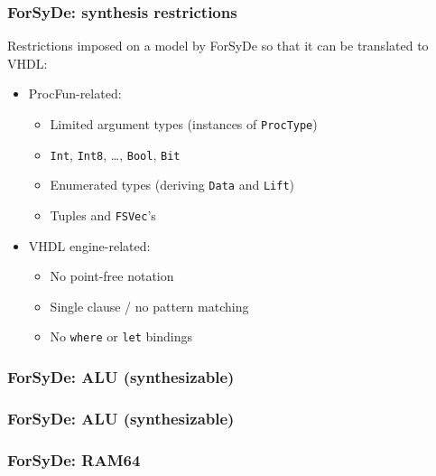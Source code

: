         \begin{frame}
            \frametitle{ForSyDe: synthesis restrictions}
            \par{Restrictions imposed on a model by ForSyDe so that it can be translated to VHDL:}
            \begin{itemize}
                \item ProcFun-related:
                    \begin{itemize}
                        \item Limited argument types (instances of \texttt{ProcType})
                        \item \texttt{Int}, \texttt{Int8}, \ldots, \texttt{Bool}, \texttt{Bit}
                        \item Enumerated types (deriving \texttt{Data} and \texttt{Lift})
                        \item Tuples and \texttt{FSVec}'s
                    \end{itemize}
                \item VHDL engine-related:
                    \begin{itemize}
                        \item No point-free notation
                        \item Single clause / no pattern matching
                        \item No \texttt{where} or \texttt{let} bindings
                    \end{itemize}
            \end{itemize}
        \end{frame}

        \begin{frame}
            \frametitle{ForSyDe: ALU (synthesizable)}
        \end{frame}

        \begin{frame}
            \frametitle{ForSyDe: ALU (synthesizable)}
        \end{frame}


        \begin{frame}
            \frametitle{ForSyDe: RAM64}
        \end{frame}

